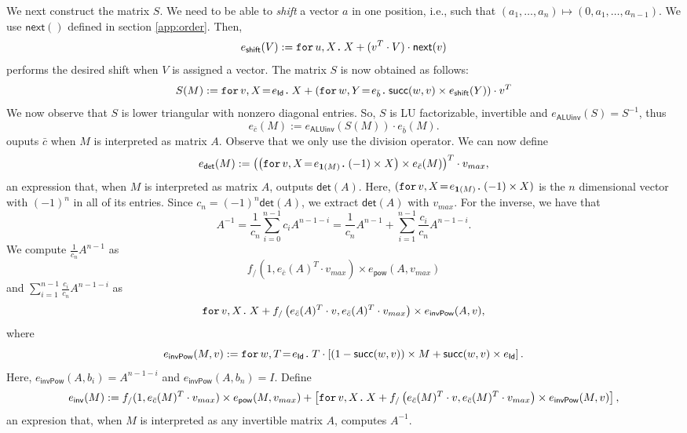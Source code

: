 We next construct the matrix $S$. We need to be able to \textit{shift} a vector $a$ in one position, i.e.,
such that $(a_1,\ldots,a_n)\mapsto (0,a_1,\ldots,a_{n-1})$. We use $\mathsf{next}()$ defined in section \ref{app:order}. Then,
$$
e_{\mathsf{shift}}(V):=\ffor{u}{X}{X+(v^T\cdot V)\cdot\mathsf{next}(v)}
$$
performs the desired shift when $V$ is assigned a vector. The matrix $S$ is now obtained as follows:
$$
S(M):=\initf{e_{\mathsf{Id}}}{v}{X}{X + \left( \initf{e_{\bar b}}{w}{Y}\mathsf{succ}(w,v)\times e_{\mathsf{shift}}(Y) \right)\cdot v^T }
$$
We now observe that $S$ is lower triangular with nonzero diagonal entries. So, $S$ is LU factorizable, invertible
and $e_{\mathsf{ALUinv}}(S)=S^{-1}$, thus
$$
e_{\bar c}(M):=e_{\mathsf{ALUinv}}(S(M))\cdot e_{\bar b}(M).
$$
ouputs $\bar c$ when $M$ is interpreted as matrix $A$. Observe that we only use the division operator.
We can now define
$$
e_{\mathsf{det}}(M):=\left( \left( \initf{e_{\ones (M)}}{v}{X}{(-1)\times X} \right) \times e_{\bar c}(M) \right)^T\cdot v_{max},
$$
an expression that, when $M$ is interpreted as matrix $A$, outputs $\mathsf{det}(A)$.
Here, $(\initf{e_{\ones (M)}}{v}{X}{(-1)\times X})$ is the $n$ dimensional vector with $(-1)^n$ in all of its entries.
Since $c_n=(-1)^n\mathsf{det}(A)$, we extract $\mathsf{det}(A)$ with $v_{max}$.
For the inverse, we have that
$$
A^{-1}=\frac{1}{c_n}\sum_{i=0}^{n-1}c_i A^{n-1-i} = \frac{1}{c_n}A^{n-1} + \sum_{i=1}^{n-1}\frac{c_i}{c_n}A^{n-1-i}.
$$
We compute $\frac{1}{c_n}A^{n-1}$ as
$$
f_{/}(1, e_{\bar c}(A)^T\cdot v_{max})\times e_{\mathsf{pow}}(A, v_{max})
$$
and $\sum_{i=1}^{n-1}\frac{c_i}{c_n}A^{n-1-i}$ as
$$
\ffor{v}{X}{X + f_{/}\left( e_{\bar c}(A)^T\cdot v, e_{\bar c}(A)^T\cdot v_{max} \right)\times e_{\mathsf{invPow}}(A, v)},
$$
where
$$
e_{\mathsf{invPow}}(M, v):= \initf{e_{\mathsf{Id}}}{w}{T}{T\cdot \left[ (1 - \mathsf{succ}(w,v))\times M + \mathsf{succ}(w,v)\times e_{\mathsf{Id}} \right]}.
$$
Here, $e_{\mathsf{invPow}}(A, b_i)=A^{n-1-i}$ and $e_{\mathsf{invPow}}(A, b_n)=I$.
Define
$$
e_{\mathsf{inv}}(M):= f_{/}(1, e_{\bar c}(M)^T\cdot v_{max})\times e_{\mathsf{pow}}(M, v_{max}) + \left[ \ffor{v}{X}{X + f_{/}\left( e_{\bar c}(M)^T\cdot v, e_{\bar c}(M)^T\cdot v_{max} \right)\times e_{\mathsf{invPow}}(M, v)} \right],
$$
an expresion that, when $M$ is interpreted as any invertible matrix $A$, computes $A^{-1}$.



